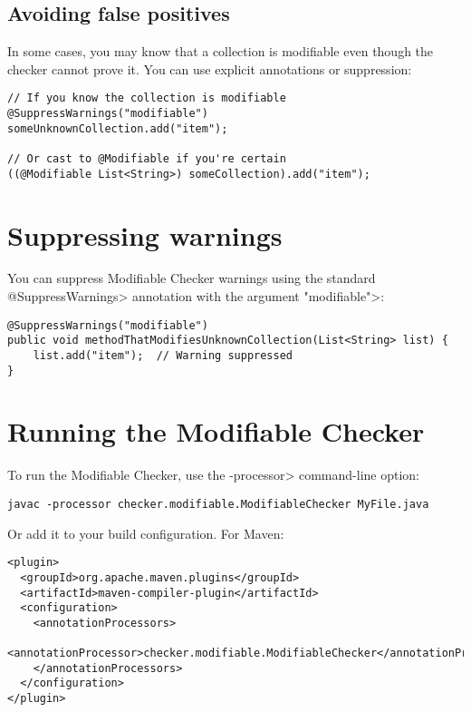 \subsection{Avoiding false positives}

In some cases, you may know that a collection is modifiable even though the
checker cannot prove it. You can use explicit annotations or suppression:

\begin{Verbatim}
// If you know the collection is modifiable
@SuppressWarnings("modifiable")
someUnknownCollection.add("item");

// Or cast to @Modifiable if you're certain
((@Modifiable List<String>) someCollection).add("item");
\end{Verbatim}

\section{Suppressing warnings\label{modifiable-suppressing}}

You can suppress Modifiable Checker warnings using the standard
\<@SuppressWarnings> annotation with the argument \<"modifiable">:

\begin{Verbatim}
@SuppressWarnings("modifiable")
public void methodThatModifiesUnknownCollection(List<String> list) {
    list.add("item");  // Warning suppressed
}
\end{Verbatim}

\section{Running the Modifiable Checker\label{modifiable-running}}

To run the Modifiable Checker, use the \<-processor> command-line option:

\begin{Verbatim}
javac -processor checker.modifiable.ModifiableChecker MyFile.java
\end{Verbatim}

Or add it to your build configuration. For Maven:

\begin{Verbatim}
<plugin>
  <groupId>org.apache.maven.plugins</groupId>
  <artifactId>maven-compiler-plugin</artifactId>
  <configuration>
    <annotationProcessors>
      <annotationProcessor>checker.modifiable.ModifiableChecker</annotationProcessor>
    </annotationProcessors>
  </configuration>
</plugin>
\end{Verbatim}

